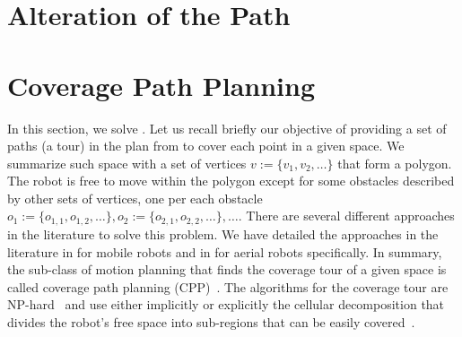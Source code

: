 \section{\color{red}Alteration of the Path}


\section{Coverage Path Planning}
\label{sec:cov-path-plan}

In this section, we solve . Let us recall briefly our objective of providing a set of paths (a tour) in the plan from  to cover each point in a given space. We summarize such space with a set of vertices $v:=\{v_1,v_2,\dots\}$ that form a polygon. The robot is free to move within the polygon except for some obstacles described by other sets of vertices, one per each obstacle $o_1:=\{o_{1,1},o_{1,2},\dots\},o_2:=\{o_{2,1},o_{2,2},\dots\},\dots$. There are several different approaches in the literature to solve this problem. We have detailed the approaches in the literature in  for mobile robots and in  for aerial robots specifically. In summary, the sub-class of motion planning that finds the coverage tour of a given space is called coverage path planning (CPP)~\citep{choset1998coverage}. The algorithms for the coverage tour are NP-hard~\citep{arkin2000approximation} and use either implicitly or explicitly the cellular decomposition that divides the robot's free space into sub-regions that can be easily covered~\citep{choset2001coverage,galceran2013survey}.

